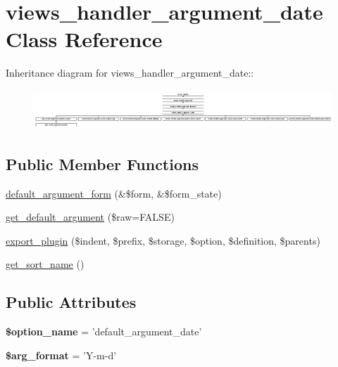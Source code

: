 \hypertarget{classviews__handler__argument__date}{
\section{views\_\-handler\_\-argument\_\-date Class Reference}
\label{classviews__handler__argument__date}
}
Inheritance diagram for views\_\-handler\_\-argument\_\-date::\begin{figure}[H]
\begin{center}
\leavevmode
\includegraphics[height=1.5047cm]{classviews__handler__argument__date}
\end{center}
\end{figure}
\subsection*{Public Member Functions}
\begin{DoxyCompactItemize}
\item 
\hyperlink{classviews__handler__argument__date_a9c6775f6c034bfcec9cd0fe0ab0e96f2}{default\_\-argument\_\-form} (\&\$form, \&\$form\_\-state)
\item 
\hyperlink{classviews__handler__argument__date_a1e5320e475b9e86ed9acc59c9a525610}{get\_\-default\_\-argument} (\$raw=FALSE)
\item 
\hyperlink{classviews__handler__argument__date_aa4fe15a71439766a9915a47277615873}{export\_\-plugin} (\$indent, \$prefix, \$storage, \$option, \$definition, \$parents)
\item 
\hyperlink{classviews__handler__argument__date_ab206fc9897b6b15df9b96ffb95c59cb5}{get\_\-sort\_\-name} ()
\end{DoxyCompactItemize}
\subsection*{Public Attributes}
\begin{DoxyCompactItemize}
\item 
\hypertarget{classviews__handler__argument__date_afbc74be2ae0b39442c7b0e90bf444f1d}{
{\bfseries \$option\_\-name} = 'default\_\-argument\_\-date'}
\label{classviews__handler__argument__date_afbc74be2ae0b39442c7b0e90bf444f1d}

\item 
\hypertarget{classviews__handler__argument__date_ab397e111130ca05d397834afede8cb35}{
{\bfseries \$arg\_\-format} = 'Y-\/m-\/d'}
\label{classviews__handler__argument__date_ab397e111130ca05d397834afede8cb35}

\end{DoxyCompactItemize}


